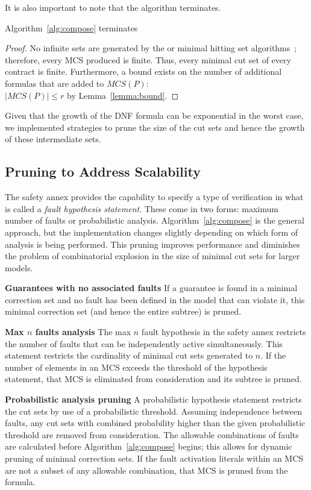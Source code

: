 It is also important to note that the algorithm terminates. 
\begin{theorem}
Algorithm~\ref{alg:compose} terminates
\begin{proof}
No infinite sets are generated by the \aivcalg or minimal hitting set algorithms~\cite{Ghassabani2017EfficientGO,murakami2013efficient}; therefore, every MCS produced is finite. Thus, every minimal cut set of every contract is finite. Furthermore, a bound exists on the number of additional formulas that are added to $\mathit{MCS(P)}$: \\
$|\mathit{MCS(P)}| \leq r$ by Lemma~\ref{lemma:bound}.
\end{proof}
\end{theorem}

Given that the growth of the DNF formula can be exponential in the worst case, we implemented strategies to prune the size of the cut sets and hence the growth of these intermediate sets. 


\subsection{Pruning to Address Scalability}
The safety annex provides the capability to specify a type of verification in what is called a \textit{fault hypothesis statement}. These come in two forms: maximum number of faults or probabilistic analysis. Algorithm~\ref{alg:compose} is the general approach, but the implementation changes slightly depending on which form of analysis is being performed. This pruning improves performance and diminishes the problem of combinatorial explosion in the size of minimal cut sets for larger models. 

\textbf{Guarantees with no associated faults} If a guarantee is found in a minimal correction set and no fault has been defined in the model that can violate it, this minimal correction set (and hence the entire subtree) is pruned.

\textbf{Max $n$ faults analysis} The max $n$ fault hypothesis in the safety annex restricts the number of faults that can be independently active simultaneously. This statement restricts the cardinality of minimal cut sets generated to $n$. If the number of elements in an MCS exceeds the threshold of the hypothesis statement, that MCS is eliminated from consideration and its subtree is pruned.


\textbf{Probabilistic analysis pruning} A probabilistic hypothesis statement restricts the cut sets by use of a probabilistic threshold. Assuming independence between faults, any cut sets with combined probability higher than the given probabilistic threshold are removed from consideration. The allowable combinations of faults are calculated before Algorithm~\ref{alg:compose} begins; this allows for dynamic pruning of minimal correction sets. If the fault activation literals within an MCS are not a subset of any allowable combination, that MCS is pruned from the formula. 








